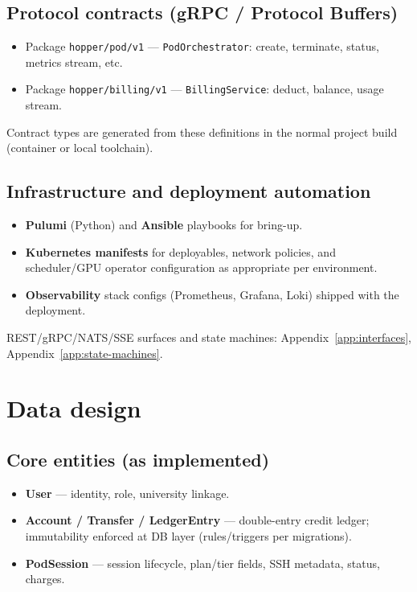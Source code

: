 \documentclass[12pt,a4paper]{article}
\begin{document}
\subsection{Protocol contracts (gRPC / Protocol Buffers)}
\begin{itemize}[leftmargin=*]
  \item Package \texttt{hopper/pod/v1} --- \texttt{PodOrchestrator}: create, terminate, status, metrics stream, etc.
  \item Package \texttt{hopper/billing/v1} --- \texttt{BillingService}: deduct, balance, usage stream.
\end{itemize}
Contract types are generated from these definitions in the normal project build (container or local toolchain).

\subsection{Infrastructure and deployment automation}
\begin{itemize}[leftmargin=*]
  \item \textbf{Pulumi} (Python) and \textbf{Ansible} playbooks for bring-up.
  \item \textbf{Kubernetes manifests} for deployables, network policies, and scheduler/GPU operator configuration as appropriate per environment.
  \item \textbf{Observability} stack configs (Prometheus, Grafana, Loki) shipped with the deployment.
\end{itemize}
REST/gRPC/NATS/SSE surfaces and state machines: Appendix~\ref{app:interfaces}, Appendix~\ref{app:state-machines}.

\section{Data design}
\label{sec:data}

\subsection{Core entities (as implemented)}
\begin{itemize}[leftmargin=*]
  \item \textbf{User} --- identity, role, university linkage.
  \item \textbf{Account / Transfer / LedgerEntry} --- double-entry credit ledger; immutability enforced at DB layer (rules/triggers per migrations).
  \item \textbf{PodSession} --- session lifecycle, plan/tier fields, SSH metadata, status, charges.
\end{itemize}
\end{document}
